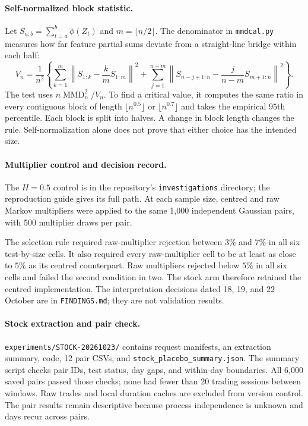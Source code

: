 \documentclass[11pt]{article}
\theoremstyle{remark}
\newcommand{\MMD}{\operatorname{MMD}}
\begin{document}
\paragraph{Self-normalized block statistic.} Let $S_{a:b}=\sum_{t=a}^b\phi(Z_t)$ and $m=\lfloor n/2\rfloor$. The denominator in \texttt{mmdcal.py} measures how far feature partial sums deviate from a straight-line bridge within each half:
\begin{equation}
V_n=\frac{1}{n^2}\left\{\sum_{k=1}^{m}\left\|S_{1:k}-\frac{k}{m}S_{1:m}\right\|^2
+\sum_{j=1}^{n-m}\left\|S_{n-j+1:n}-\frac{j}{n-m}S_{m+1:n}\right\|^2\right\}.
\end{equation}
The test uses $n\MMD_n^2/V_n$. To find a critical value, it computes the same ratio in every contiguous block of length $\lfloor n^{0.5}\rfloor$ or $\lfloor n^{0.7}\rfloor$ and takes the empirical $95$th percentile. Each block is split into halves. A change in block length changes the rule. Self-normalization alone does not prove that either choice has the intended size.

\paragraph{Multiplier control and decision record.} The $H=0.5$ control is in the repository's \texttt{investigations} directory; the reproduction guide gives its full path. At each sample size, centred and raw Markov multipliers were applied to the same 1,000 independent Gaussian pairs, with 500 multiplier draws per pair.

The selection rule required raw-multiplier rejection between $3\%$ and $7\%$ in all six test-by-size cells. It also required every raw-multiplier cell to be at least as close to $5\%$ as its centred counterpart. Raw multipliers rejected below $5\%$ in all six cells and failed the second condition in two. The stock arm therefore retained the centred implementation. The interpretation decisions dated 18, 19, and 22 October are in \texttt{FINDINGS.md}; they are not validation results.

\paragraph{Stock extraction and pair check.} \texttt{experiments/STOCK-20261023/} contains request manifests, an extraction summary, code, 12 pair CSVs, and \texttt{stock\_placebo\_summary.json}. The summary script checks pair IDs, test status, day gaps, and within-day boundaries. All 6,000 saved pairs passed those checks; none had fewer than 20 trading sessions between windows. Raw trades and local duration caches are excluded from version control. The pair results remain descriptive because process independence is unknown and days recur across pairs.



\end{document}
